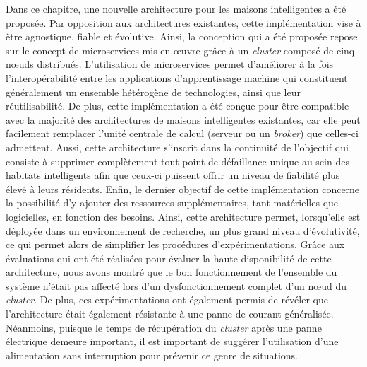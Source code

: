 Dans ce chapitre, une nouvelle architecture pour les maisons intelligentes a été proposée. Par opposition aux architectures existantes, cette implémentation vise à être agnostique, fiable et évolutive. Ainsi, la conception qui a été proposée repose sur le concept de microservices mis en \oe{}uvre grâce à un \textit{cluster} composé de cinq n\oe{}uds distribués. L'utilisation de microservices permet d'améliorer à la fois l'interopérabilité entre les applications d'apprentissage machine qui constituent généralement un ensemble hétérogène de technologies, ainsi que leur réutilisabilité. De plus, cette implémentation a été conçue pour être compatible avec la majorité des architectures de maisons intelligentes existantes, car elle peut facilement remplacer l'unité centrale de calcul (serveur ou un \textit{broker}) que celles-ci admettent. Aussi, cette architecture s'inscrit dans la continuité de l'objectif qui consiste à supprimer complètement tout point de défaillance unique au sein des habitats intelligents afin que ceux-ci puissent offrir un niveau de fiabilité plus élevé à leurs résidents. Enfin, le dernier objectif de cette implémentation concerne la possibilité d'y ajouter des ressources supplémentaires, tant matérielles que logicielles, en fonction des besoins. Ainsi, cette architecture permet, lorsqu'elle est déployée dans un environnement de recherche, un plus grand niveau d'évolutivité, ce qui permet alors de simplifier les procédures d'expérimentations. Grâce aux évaluations qui ont été réalisées pour évaluer la haute disponibilité de cette architecture, nous avons montré que le bon fonctionnement de l'ensemble du système n'était pas affecté lors d'un dysfonctionnement complet d'un n\oe{}ud du \textit{cluster}. De plus, ces expérimentations ont également permis de révéler que l'architecture était également résistante à une panne de courant généralisée. Néanmoins, puisque le temps de récupération du \textit{cluster} après une panne électrique demeure important, il est important de suggérer l'utilisation d'une alimentation sans interruption pour prévenir ce genre de situations.
